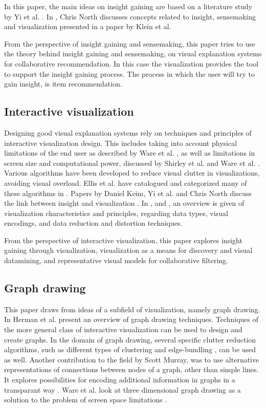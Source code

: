 \documentclass[a4paper,10pt,twocolumn]{article}
\begin{document}
In this paper, the main ideas on insight gaining are based on a literature study by Yi et al. \cite{yi2008}. In \cite{north2006}, Chris North discusses concepts related to insight, sensemaking and visualization presented in a paper \cite{klein2006} by Klein et al.

From the perspective of insight gaining and sensemaking, this paper tries to use the theory behind insight gaining and sensemaking, on visual explanation systems for collaborative recommendation. In this case the visualization provides the tool to support the insight gaining process. The process in which the user will try to gain insight, is item recommendation.


\subsection*{Interactive visualization}

Designing good visual explanation systems rely on techniques and principles of interactive visualization design. This includes taking into account physical limitations of the end user as described by Ware et al. \cite{ware2004}, as well as limitations in screen size and computational power, discussed by Shirley et al. and Ware et al. \cite{shirley2009, ware2004}. Various algorithms have been developed to reduce visual clutter in visualizations, avoiding visual overload. Ellis et al. have catalogued and categorized many of these algorithms in \cite{ellis2007}. Papers by Daniel Keim, Yi et al. and Chris North discuss the link between insight and visualization \cite{keim2002, yi2008, north2006}. In \cite{shirley2009}, \cite{ware2004} and \cite{keim2002}, an overview is given of visualization characteristics and principles, regarding data types, visual encodings, and data reduction and distortion techniques.

From the perspective of interactive visualization, this paper explores insight gaining through visualization, visualization as a means for discovery and visual datamining, and representative visual models for collaborative filtering.


\subsection*{Graph drawing}

This paper draws from ideas of a subfield of visualization, namely graph drawing. In \cite{herman2000} Herman et al. present an overview of graph drawing techniques. Techniques of the more general class of interactive visualization can be used to design and create graphs. In the domain of graph drawing, several specific clutter reduction algorithms, such as different types of clustering and edge-bundling \cite{herman2000, holten2009}, can be used as well. Another contribution to the field by Scott Murray, was to use alternative representations of connections between nodes of a graph, other than simple lines. It explores possibilities for encoding additional information in graphs in a transparant way \cite{murray2008}. Ware et al. look at three dimensional graph drawing as a solution to the problem of screen space limitations \cite{ware2008}.
\end{document}
